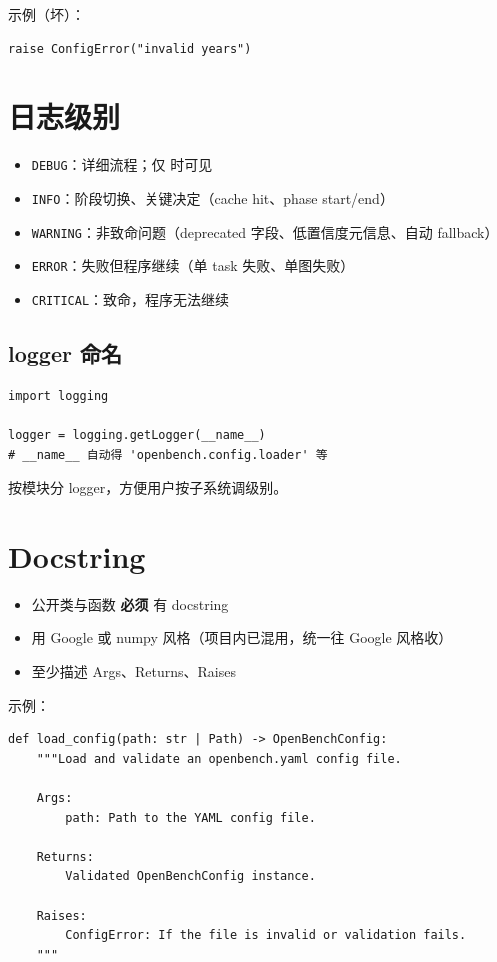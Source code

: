 示例（坏）：

\begin{verbatim}
raise ConfigError("invalid years")
\end{verbatim}

\section{日志级别}

\begin{itemize}
  \item \texttt{DEBUG}：详细流程；仅  时可见
  \item \texttt{INFO}：阶段切换、关键决定（cache hit、phase start/end）
  \item \texttt{WARNING}：非致命问题（deprecated 字段、低置信度元信息、自动 fallback）
  \item \texttt{ERROR}：失败但程序继续（单 task 失败、单图失败）
  \item \texttt{CRITICAL}：致命，程序无法继续
\end{itemize}

\subsection{logger 命名}

\begin{verbatim}
import logging

logger = logging.getLogger(__name__)
# __name__ 自动得 'openbench.config.loader' 等
\end{verbatim}

按模块分 logger，方便用户按子系统调级别。

\section{Docstring}

\begin{itemize}
  \item 公开类与函数 \textbf{必须} 有 docstring
  \item 用 Google 或 numpy 风格（项目内已混用，统一往 Google 风格收）
  \item 至少描述 Args、Returns、Raises
\end{itemize}

示例：

\begin{verbatim}
def load_config(path: str | Path) -> OpenBenchConfig:
    """Load and validate an openbench.yaml config file.

    Args:
        path: Path to the YAML config file.

    Returns:
        Validated OpenBenchConfig instance.

    Raises:
        ConfigError: If the file is invalid or validation fails.
    """
\end{verbatim}

